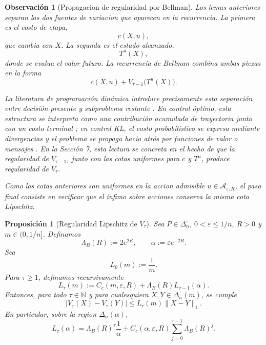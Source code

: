\documentclass[12pt]{article}
\newtheorem{proposicion}{Proposición}[section]
\newtheorem{observacion}{Observación}[section]
\begin{document}
\begin{observacion}[Propagacion de regularidad por Bellman]\label{obs:propagacion_regularidad_bellman}
Los lemas anteriores separan las dos fuentes de variacion que aparecen en la recurrencia. La primera es el costo de etapa,
\[
c(X,u),
\]
que cambia con \(X\). La segunda es el estado alcanzado,
\[
T^u(X),
\]
donde se evalua el valor futuro. La recurrencia de Bellman combina ambas piezas en la forma
\[
c(X,u)+V_{\tau-1}\bigl(T^u(X)\bigr).
\]

La literatura de programación dinámica introduce precisamente esta separación entre decisión presente y subproblema restante \citep{ref18}. En control óptimo, esta estructura se interpreta como una contribución acumulada de trayectoria junto con un costo terminal \citep{Kappen2005LinearTheoryForControlOfNonLinearStochasticSystems}; en control KL, el costo probabilístico se expresa mediante divergencias y el problema se propaga hacia atrás por funciones de valor o mensajes \citep{KappenGomezOpper2012OptimalControlAsAGraphicalModelInferenceProblem}. En la Sección 7, esta lectura se concreta en el hecho de que la regularidad de \(V_{\tau-1}\), junto con las cotas uniformes para \(c\) y \(T^u\), produce regularidad de \(V_\tau\).

Como las cotas anteriores son uniformes en la accion admisible \(u\in\mathcal A_{\varepsilon,R}\), el paso final consiste en verificar que el infimo sobre acciones conserva la misma cota Lipschitz.
\end{observacion}

\begin{proposicion}[Regularidad Lipschitz de \(V_\tau\)]\label{prop:lipschitz_V_tau_bellman}
Sea \(P\in\Delta_n^\circ\), \(0<\varepsilon\le 1/n\), \(R>0\) y \(m\in(0,1/n]\). Definamos
\[
\Lambda_B(R):=2e^{2R},
\qquad
\alpha:=\varepsilon e^{-2R}.
\]
Sea
\[
L_0(m):=\frac1m.
\]
Para \(\tau\ge 1\), definamos recursivamente
\[
L_\tau(m)
:=
C_c(m,\varepsilon,R)
+
\Lambda_B(R)L_{\tau-1}(\alpha).
\]
Entonces, para todo \(\tau\in\mathbb N\) y para cualesquiera \(X,Y\in\Delta_n(m)\), se cumple
\[
|V_\tau(X)-V_\tau(Y)|
\le
L_\tau(m)\|X-Y\|_1.
\]
En particular, sobre la region \(\Delta_n(\alpha)\),
\[
L_\tau(\alpha)
=
\Lambda_B(R)^\tau\frac1\alpha
+
C_c(\alpha,\varepsilon,R)
\sum_{j=0}^{\tau-1}\Lambda_B(R)^j.
\]
\end{proposicion}
\end{document}
